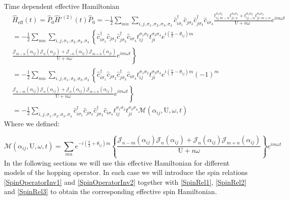 \begin{section}{Time dependent effective Hamiltonian}
\begin{align}
&\hat{H}_{\text{eff}}(t) = \hat{P}_0\hat{H}'^{(2)}(t)\hat{P}_0 = - \frac{1}{2}\sum_{mn} \sum_{i,j, \sigma_1, \sigma_2, \sigma_3, \sigma_4}\hat{c}_{i \sigma_1}^\dagger \hat{c}_{j \sigma_2} \hat{c}_{j \sigma_3}^\dagger \hat{c}_{i \sigma_4} \frac{t_{ij,m-n}^{\sigma_1 \sigma_2} t_{ji,n}^{\sigma_3 \sigma_4} + t_{ij,-n}^{\sigma_1 \sigma_2} t_{ji,m+n}^{\sigma_3 \sigma_4}}{\text{U}+n\omega} e^{im\omega t} \nonumber \\
&= - \frac{1}{2}\sum_{mn} \sum_{i,j, \sigma_1, \sigma_2, \sigma_3, \sigma_4} \left\{ \hat{c}_{i \sigma_1}^\dagger \hat{c}_{j \sigma_2} \hat{c}_{j \sigma_3}^\dagger \hat{c}_{i \sigma_4} t_{ij}^{\sigma_1 \sigma_2} t_{ji}^{\sigma_3 \sigma_4} e^{i(\frac{\pi}{2}-\theta_{ij})m} \right. \nonumber \\
& \left. \frac{ \mathcal{J}_{m-n}(\alpha_{ij}) \mathcal{J}_{n}(\alpha_{ji}) + \mathcal{J}_{-n}(\alpha_{ij}) \mathcal{J}_{m+n}(\alpha_{ji})}{\text{U}+n\omega} e^{im\omega t} \right\} \nonumber \\
&= - \frac{1}{2}\sum_{mn} \sum_{i,j, \sigma_1, \sigma_2, \sigma_3, \sigma_4} \left\{ \hat{c}_{i \sigma_1}^\dagger \hat{c}_{j \sigma_2} \hat{c}_{j \sigma_3}^\dagger \hat{c}_{i \sigma_4} t_{ij}^{\sigma_1 \sigma_2} t_{ji}^{\sigma_3 \sigma_4} e^{i(\frac{\pi}{2}-\theta_{ij})m} (-1)^m \right. \nonumber \\
&\left. \frac{ \mathcal{J}_{n-m}(\alpha_{ij}) \mathcal{J}_{n}(\alpha_{ij}) + \mathcal{J}_{n}(\alpha_{ij}) \mathcal{J}_{m+n}(\alpha_{ij})}{\text{U}+n\omega} e^{im\omega t} \right\} \nonumber \\
&= - \frac{1}{2} \sum_{i,j, \sigma_1, \sigma_2, \sigma_3, \sigma_4}\hat{c}_{i \sigma_1}^\dagger \hat{c}_{j \sigma_2} \hat{c}_{j \sigma_3}^\dagger \hat{c}_{i \sigma_4} t_{ij}^{\sigma_1 \sigma_2} t_{ji}^{\sigma_3 \sigma_4} \mathcal{M}(\alpha_{ij}, \text{U}, \omega, t) \label{HeffSimplified}
\end{align}
Where we defined:

\begin{equation}
\mathcal{M}(\alpha_{ij}, \text{U}, \omega, t) = \sum_{mn}e^{-i(\frac{\pi}{2}+\theta_{ij})m} \left\{ 
    \frac{\mathcal{J}_{n-m}(\alpha_{ij})\mathcal{J}_{n}(\alpha_{ij}) + \mathcal{J}_{n}(\alpha_{ij})\mathcal{J}_{m+n}(\alpha_{ij})}{\text{U}+n\omega} \right\}e^{im\omega t}
\end{equation}
In the following sections we will use this effective Hamiltonian for different models of the hopping operator. In each case we will introduce the spin relations \ref{SpinOperatorInv1} and \ref{SpinOperatorInv2} together with \ref{SpinRel1}, \ref{SpinRel2} and \ref{SpinRel3} to obtain the corresponding effective spin Hamiltonian. 


\end{section}
